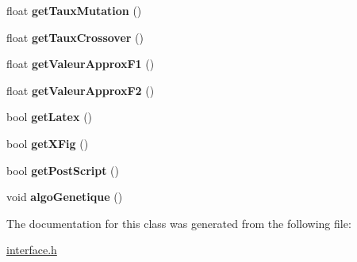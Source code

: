 \begin{DoxyCompactItemize}
float {\bfseries get\+Taux\+Mutation} ()
\item 
\mbox{\label{class_interface_a319f2bc45a2cfb2fe56a2e8795d8ef36}} 
float {\bfseries get\+Taux\+Crossover} ()
\item 
\mbox{\label{class_interface_a543c5de2681de9830c8de70e6bc14ce1}} 
float {\bfseries get\+Valeur\+Approx\+F1} ()
\item 
\mbox{\label{class_interface_ad41dc37c48ade6282b087e94757e5303}} 
float {\bfseries get\+Valeur\+Approx\+F2} ()
\item 
\mbox{\label{class_interface_a9579d9b5ac11a8aa104df9a87f7918d8}} 
bool {\bfseries get\+Latex} ()
\item 
\mbox{\label{class_interface_a27f30fe9598a6cc8629bd2e8d162cce3}} 
bool {\bfseries get\+X\+Fig} ()
\item 
\mbox{\label{class_interface_aa3b45c8bd81682e29ba7e8fee7424ae0}} 
bool {\bfseries get\+Post\+Script} ()
\item 
\mbox{\label{class_interface_ab18110b58c994e7bc4971deb8578d367}} 
void {\bfseries algo\+Genetique} ()
\end{DoxyCompactItemize}


The documentation for this class was generated from the following file\+:\begin{DoxyCompactItemize}
\item 
\hyperlink{interface_8h}{interface.\+h}\end{DoxyCompactItemize}

